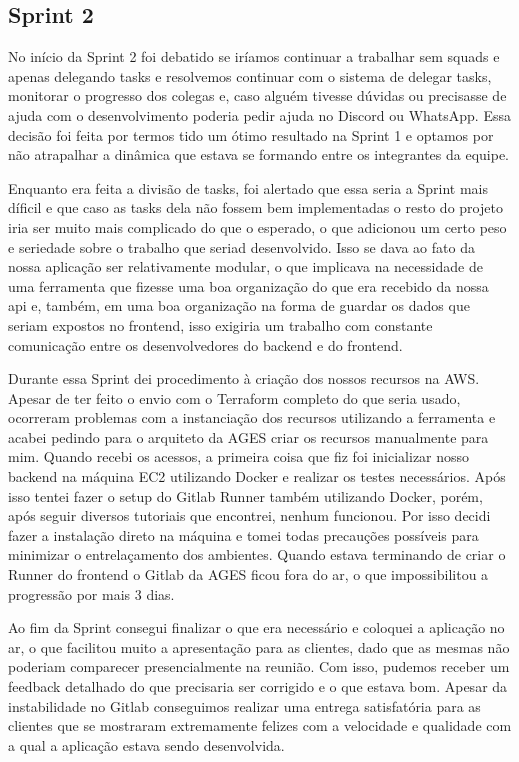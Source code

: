 \subsection{Sprint 2}

No início da Sprint 2 foi debatido se iríamos continuar a trabalhar sem squads e apenas delegando tasks e resolvemos continuar com o sistema de delegar tasks, monitorar o progresso dos colegas e, caso alguém tivesse dúvidas ou precisasse de ajuda com o desenvolvimento poderia pedir ajuda no Discord ou WhatsApp. Essa decisão foi feita por termos tido um ótimo resultado na Sprint 1 e optamos por não atrapalhar a dinâmica que estava se formando entre os integrantes da equipe.

Enquanto era feita a divisão de tasks, foi alertado que essa seria a Sprint mais díficil e que caso as tasks dela não fossem bem implementadas o resto do projeto iria ser muito mais complicado do que o esperado, o que adicionou um certo peso e seriedade sobre o trabalho que seriad desenvolvido. Isso se dava ao fato da nossa aplicação ser relativamente modular, o que implicava na necessidade de uma ferramenta que fizesse uma boa organização do que era recebido da nossa \ac{api} e, também, em uma boa organização na forma de guardar os dados que seriam expostos no frontend, isso exigiria um trabalho com constante comunicação entre os desenvolvedores do backend e do frontend.

Durante essa Sprint dei procedimento à criação dos nossos recursos na AWS. Apesar de ter feito o envio com o Terraform completo do que seria usado, ocorreram problemas com a instanciação dos recursos utilizando a ferramenta e acabei pedindo para o arquiteto da AGES criar os recursos manualmente para mim. Quando recebi os acessos, a primeira coisa que fiz foi inicializar nosso backend na máquina EC2 utilizando Docker e realizar os testes necessários. Após isso tentei fazer o setup do Gitlab Runner também utilizando Docker, porém, após seguir diversos tutoriais que encontrei, nenhum funcionou. Por isso decidi fazer a instalação direto na máquina e tomei todas precauções possíveis para minimizar o entrelaçamento dos ambientes. Quando estava terminando de criar o Runner do frontend o Gitlab da AGES ficou fora do ar, o que impossibilitou a progressão por mais 3 dias.

Ao fim da Sprint consegui finalizar o que era necessário e coloquei a aplicação no ar, o que facilitou muito a apresentação para as clientes, dado que as mesmas não poderiam comparecer presencialmente na reunião. Com isso, pudemos receber um feedback detalhado do que precisaria ser corrigido e o que estava bom. Apesar da instabilidade no Gitlab conseguimos realizar uma entrega satisfatória para as clientes que se mostraram extremamente felizes com a velocidade e qualidade com a qual a aplicação estava sendo desenvolvida.